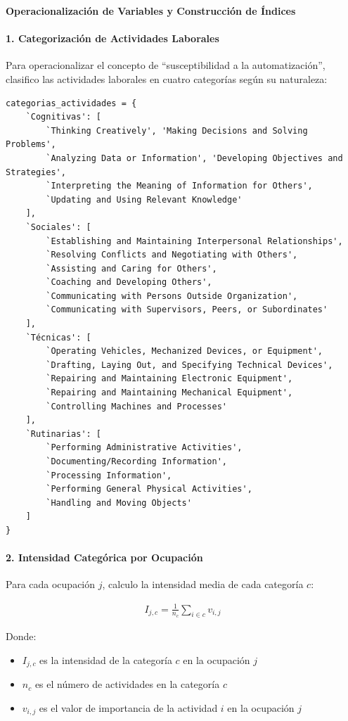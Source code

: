 \documentclass{article}
\theoremstyle{remark}
\theoremstyle{definition}
\begin{document}
\begin{tcolorbox}
\textbf{Operacionalización de Variables y Construcción de Índices}

\paragraph{1. Categorización de Actividades Laborales}
Para operacionalizar el concepto de ``susceptibilidad a la automatización'', clasifico las actividades laborales en cuatro categorías según su naturaleza:

\begin{verbatim}
categorias_actividades = {
    `Cognitivas': [
        `Thinking Creatively', 'Making Decisions and Solving Problems',
        `Analyzing Data or Information', 'Developing Objectives and Strategies',
        `Interpreting the Meaning of Information for Others',
        `Updating and Using Relevant Knowledge'
    ],
    `Sociales': [
        `Establishing and Maintaining Interpersonal Relationships',
        `Resolving Conflicts and Negotiating with Others',
        `Assisting and Caring for Others',
        `Coaching and Developing Others',
        `Communicating with Persons Outside Organization',
        `Communicating with Supervisors, Peers, or Subordinates'
    ],
    `Técnicas': [
        `Operating Vehicles, Mechanized Devices, or Equipment',
        `Drafting, Laying Out, and Specifying Technical Devices',
        `Repairing and Maintaining Electronic Equipment',
        `Repairing and Maintaining Mechanical Equipment',
        `Controlling Machines and Processes'
    ],
    `Rutinarias': [
        `Performing Administrative Activities',
        `Documenting/Recording Information',
        `Processing Information',
        `Performing General Physical Activities',
        `Handling and Moving Objects'
    ]
}
\end{verbatim}

\paragraph{2. Intensidad Categórica por Ocupación}
Para cada ocupación $j$, calculo la intensidad media de cada categoría $c$:

\begin{align}
I_{j,c} = \frac{1}{n_c} \sum_{i \in c} v_{i,j}
\end{align}

Donde:
\begin{itemize}
\item $I_{j,c}$ es la intensidad de la categoría $c$ en la ocupación $j$
\item $n_c$ es el número de actividades en la categoría $c$
\item $v_{i,j}$ es el valor de importancia de la actividad $i$ en la ocupación $j$
\end{itemize}


\end{tcolorbox}
\end{document}
